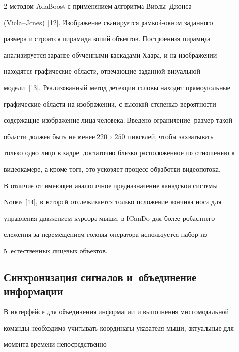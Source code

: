 \begin{multicols}{2}
методом AdaBoost с применением алгоритма Вио\-лы--Джон\-са 


  (Viola--Jones)~[12]. Изображение сканируется рамкой-окном заданного 


размера и строится пирамида копий объектов. Построенная пирамида 


анализируется заранее обучен\-ны\-ми каскадами Хаара, и на изображении 


находятся графические области, отвечающие заданной визуальной 


модели~[13]. Реализованный метод детекции головы находит прямоугольные 


графические области на изображении, с высокой степенью вероятности 


содержащие изображение лица человека. Введено ограничение: размер такой 


области должен быть не менее $220\times250$~пикселей, чтобы захватывать 


только одно лицо в кадре, достаточно близко расположенное по отношению к 


видеокамере, а кроме того, это ускоряет процесс обработки видеопотока. 


  


  В отличие от имеющей аналогичное предназначение канадской системы 


Nouse~[14], в которой отслеживается только положение кончика носа для 


управления движением курсора мыши, в ICanDo для более робастного 


слежения за перемещением головы оператора используется набор из 


5~естественных лицевых объектов.





\subsection{Синхронизация сигналов и~объединение информации}





  В интерфейсе для объединения информации и выполнения многомодальной 


команды необходимо учитывать координаты указателя мыши, актуальные для 


момента времени непосредственно\linebreak



\end{multicols}
